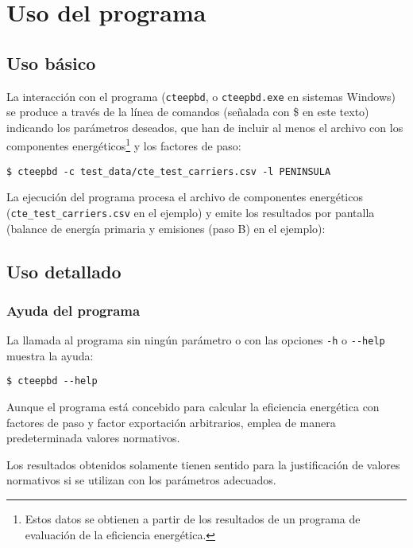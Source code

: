 \documentclass[10pt,notitlepage,oneside,a4paper]{article}
\begin{document}
\clearpage
\newpage
\section{Uso del programa}
\label{sec:usoprograma}

\subsection{Uso básico}

La interacción con el programa (\texttt{cteepbd}, o \texttt{cteepbd.exe} en sistemas Windows) se produce a través de la línea de comandos (señalada con \$ en este texto) indicando los parámetros deseados, que han de incluir al menos el archivo con los componentes energéticos\footnote{Estos datos se obtienen a partir de los resultados de un programa de evaluación de la eficiencia energética.} y los factores de paso:

\begin{Verbatim}[fontsize=\small]
    $ cteepbd -c test_data/cte_test_carriers.csv -l PENINSULA
\end{Verbatim}

La ejecución del programa procesa el archivo de componentes energéticos
(\texttt{cte\_test\_carriers.csv} en el ejemplo) y emite los resultados por pantalla (balance de energía primaria y emisiones (paso B) en el ejemplo):


\clearpage
\newpage
\subsection{Uso detallado}

\subsubsection{Ayuda del programa}
La llamada al programa sin ningún parámetro o con las opciones \texttt{-h} o \texttt{-{}-help} muestra la ayuda:

\begin{Verbatim}[fontsize=\small]
    $ cteepbd --help
\end{Verbatim}


\begin{myquote}\footnotesize
    Aunque el programa está concebido para calcular la eficiencia energética con factores de paso y factor exportación arbitrarios, emplea de manera predeterminada valores normativos.

    Los resultados obtenidos solamente tienen sentido para la justificación de valores normativos si se utilizan con los parámetros adecuados.
\end{myquote}
\end{document}
